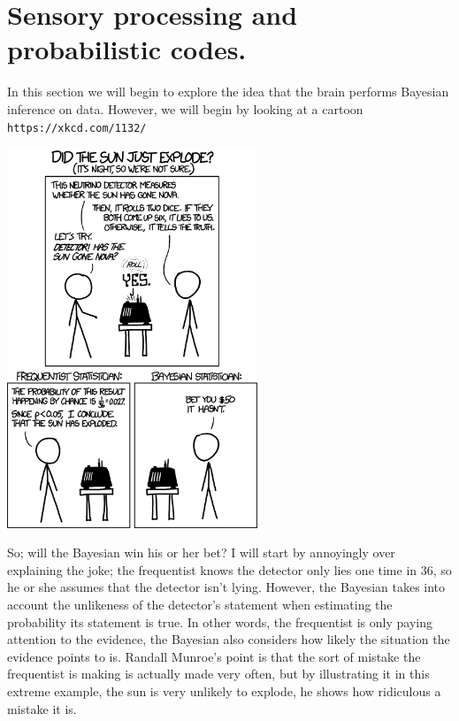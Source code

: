 \documentclass[12pt]{article}
\begin{document}
\section*{Sensory processing and probabilistic codes.}

In this section we will begin to explore the idea that the brain
performs Bayesian inference on data. However, we will begin by looking at a cartoon \texttt{https://xkcd.com/1132/}

\begin{center}
\includegraphics[width=7.5cm]{frequentists_vs_bayesians.png}
\end{center}

So; will the Bayesian win his or her bet? I will start by annoyingly
over explaining the joke; the frequentist knows the detector only lies
one time in 36, so he or she assumes that the detector isn't
lying. However, the Bayesian takes into account the unlikeness of
the detector's statement when estimating the probability its
statement is true. In other words, the frequentist is only paying
attention to the evidence, the Bayesian also considers how likely the
situation the evidence points to is. Randall Munroe's point is that
the sort of mistake the frequentist is making is actually made very
often, but by illustrating it in this extreme example, the sun is very
unlikely to explode, he shows how ridiculous a mistake it is. 
\end{document}

